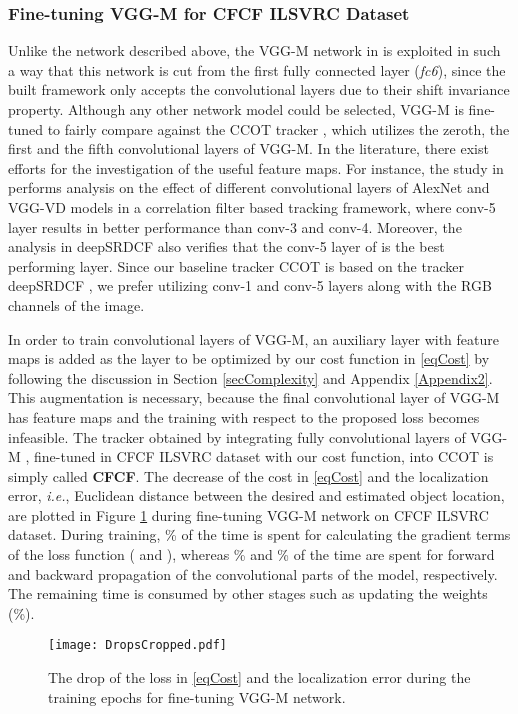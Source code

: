 \documentclass[journal]{IEEEtran}
\begin{document}
\subsubsection{Fine-tuning VGG-M \cite{VGG} for CFCF ILSVRC Dataset}
Unlike the network described above, the VGG-M network in \cite{VGG} is exploited in such a way that this network is cut from the first fully connected layer (\emph{fc6}), since the built framework only accepts the convolutional layers due to their shift invariance property. Although any other network model could be selected, VGG-M is fine-tuned to fairly compare against the CCOT tracker \cite{CCOT}, which utilizes the zeroth, the first and the fifth convolutional layers of VGG-M. In the literature, there exist efforts for the investigation of the useful feature maps. For instance, the study in \cite{HCF} performs analysis on the effect of different convolutional layers of AlexNet \cite{ImageNetCNN} and VGG-VD \cite{VGG_verydeep} models in a correlation filter based tracking framework, where conv-5 layer results in better performance than conv-3 and conv-4. Moreover, the analysis in deepSRDCF \cite{deepSRDCF} also verifies that the conv-5 layer of \cite{VGG} is the best performing layer. Since our baseline tracker CCOT is based on the tracker deepSRDCF \cite{deepSRDCF}, we prefer utilizing conv-1 and conv-5 layers along with the RGB channels of the image.

In order to train convolutional layers of VGG-M, an auxiliary layer with  feature maps is added as the layer to be optimized by our cost function in \eqref{eqCost} by following the discussion in Section \ref{secComplexity} and Appendix \ref{Appendix2}. This augmentation is necessary, because the final convolutional layer of VGG-M has  feature maps and the training with respect to the proposed loss becomes infeasible. The tracker obtained by integrating fully convolutional layers of VGG-M \cite{VGG}, fine-tuned in CFCF ILSVRC dataset with our cost function, into CCOT is simply called \textbf{CFCF}. The decrease of the cost in \eqref{eqCost} and the localization error, \emph{i.e.}, Euclidean distance between the desired and estimated object location, are plotted in Figure \ref{costdrop} during fine-tuning VGG-M network on CFCF ILSVRC dataset. During training, \% of the time is spent for calculating the gradient terms of the loss function ( and ), whereas \% and \% of the time are spent for forward and backward propagation of the convolutional parts of the model, respectively. The remaining time is consumed by other stages such as updating the weights (\%).
\begin{figure}[ht]
\centering
\texttt{[image: DropsCropped.pdf]}
\caption{The drop of the loss in \eqref{eqCost} and the localization error during the training epochs for fine-tuning VGG-M network.}
\label{costdrop}
\normalsize
\end{figure}
\end{document}
